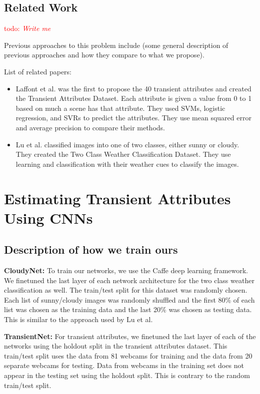 \documentclass{article}
\newcommand{\todo}[1]{\textcolor{red}{todo: {\em #1}}}
\begin{document}
\subsection{Related Work}

\todo{Write me}

Previous approaches to this problem include (some general description
of previous approaches and how they compare to what we propose).

List of related papers:
\begin{itemize}

	\item Laffont\cite{Laffont14} et al. was the first to propose the 40
		transient attributes and created the Transient Attributes Dataset.
		Each attribute is given a value from 0 to 1 based on much a scene
		has that attribute. 	They used SVMs, logistic regression, and SVRs 
		to predict the attributes.  They use mean squared error and average 
		precision to compare their methods.

	\item Lu\cite{lutwoclass} et al. classified images into one of two 
		classes, either sunny or cloudy.  They created the Two Class 
		Weather Classification Dataset.  They use learning and classification
		with their weather cues to classify the images. 

\end{itemize}

\section{Estimating Transient Attributes Using CNNs}

\subsection{Description of how we train ours}
\indent

\textbf{CloudyNet:} To train our networks, we use the Caffe\cite{caffe14} 
deep learning framework. We finetuned the last layer of each network architecture
for the two class weather classification as well.  The train/test split for this dataset
was randomly chosen.  Each list of sunny/cloudy images was randomly shuffled and the 
first 80\% of each list was chosen as the training data and the last 20\% was chosen
as testing data.  This is similar to the approach used by Lu\cite{lutwoclass} et al.

\textbf{TransientNet:} For transient attributes, we finetuned the last layer of each
of the networks using the holdout split in the transient attributes dataset.  This 
train/test split uses the data from 81 webcams for training and the data from 20 separate 
webcams for testing.  Data from webcams in the training set does not
appear in the testing set using the holdout split.  This is contrary to 
the random train/test split.  
\end{document}
